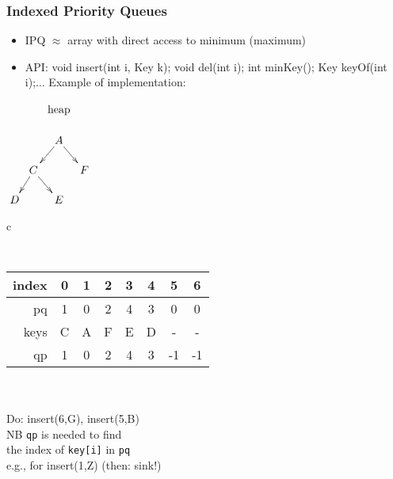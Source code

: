 \documentclass[handout]{beamer}
\begin{document}
\begin{frame}
    \frametitle{Indexed Priority Queues}
\label{indexedprioqueues}
\begin{itemize}[<+->]
\item IPQ ${\approx}$ array with direct access to minimum (maximum)
\item API: void insert(int i, Key k); void del(int i); int minKey(); Key keyOf(int i);...
Example of implementation:
\end{itemize}
$\xymatrix@R=.5cm@C=.1cm{
&&\text{heap}\\
&&A \ar@{>}[ld]\ar@{>}[rd]&&\\
&C\ar@{>}[ld]\ar@{>}[rd]&&F\\
D&&E&}
$
\begin{tabular}{c}
{\tt
\begin{tabular}{|r|c|c|c|c|c|c|c|}
\hline
index & 0&1&2&3&4&5&6 \\\hline
pq    & 1&0&2&4&3&0&0 \\\hline
keys  & C&A&F&E&D&-&- \\\hline
qp    & 1&0&2&4&3&-1&-1\\\hline
\end{tabular}
}\\
\\
Do: insert(6,G), insert(5,B)\\
NB  {\tt qp} is needed to find \\
the index of {\tt key[i]} in {\tt pq}\\
e.g., for insert(1,Z) (then: sink!)
\end{tabular}
\end{frame}
\end{document}
